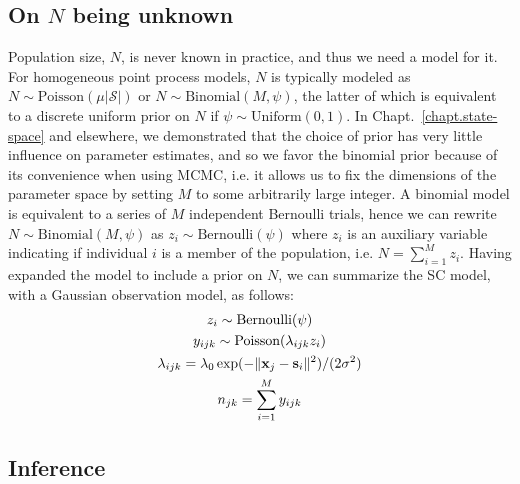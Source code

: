 \subsection{On $N$ being unknown}
\label{unmarked.sec.N}

Population size, $N$, is never known in practice, and thus %
we need a model for it. For homogeneous point process models,
$N$ is typically modeled as
$N \sim \text{Poisson}(\mu|\mathcal{S}|)$ or
$N \sim \text{Binomial}(M, \psi)$, the latter of which is equivalent
to a discrete uniform prior on $N$ if $\psi \sim \text{Uniform}(0,1)$. In
Chapt.~\ref{chapt.state-space} and elsewhere, we demonstrated that
the choice of prior has very little influence on parameter estimates,
and so we favor the binomial prior because of its convenience when
using MCMC, i.e. it allows us to fix the
dimensions of the parameter space by setting $M$ to some arbitrarily
large integer.
A binomial model is
equivalent to a series of $M$ independent Bernoulli trials, hence
we can rewrite $N \sim \text{Binomial}(M, \psi)$ as $z_i \sim
\text{Bernoulli}(\psi)$ where $z_i$ is an auxiliary variable
indicating if individual $i$ is a member of the population, i.e. $N =
\sum_{i=1}^M z_i$. Having expanded the model to include a prior on $N$, we
can summarize the SC model, with a Gaussian observation model, as follows:
\begin{gather*}
  z_i \sim \text{Bernoulli}(\psi) \\
  y_{ijk} \sim \text{Poisson}(\lambda_{ijk} z_i) \\
  \lambda_{ijk} = \lambda_0\exp(-\|{\bf x}_j - {\bf s}_i\|^2)/(2\sigma^2) \\
  n_{jk} = \sum_{i=1}^M y_{ijk} %
\end{gather*}



\subsection{Inference}

